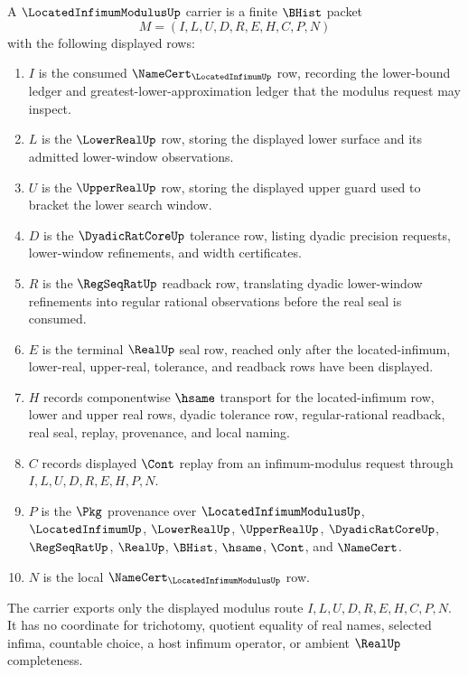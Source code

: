 \begin{definition}
\label{def:located-infimum-modulus-carrier}
A $\LocatedInfimumModulusUp$ carrier is a finite $\BHist$ packet
$$
M=(I,L,U,D,R,E,H,C,P,N)
$$
with the following displayed rows:
\begin{enumerate}
\item $I$ is the consumed $\NameCert_{\LocatedInfimumUp}$ row, recording the lower-bound ledger and greatest-lower-approximation ledger that the modulus request may inspect.
\item $L$ is the $\LowerRealUp$ row, storing the displayed lower surface and its admitted lower-window observations.
\item $U$ is the $\UpperRealUp$ row, storing the displayed upper guard used to bracket the lower search window.
\item $D$ is the $\DyadicRatCoreUp$ tolerance row, listing dyadic precision requests, lower-window refinements, and width certificates.
\item $R$ is the $\RegSeqRatUp$ readback row, translating dyadic lower-window refinements into regular rational observations before the real seal is consumed.
\item $E$ is the terminal $\RealUp$ seal row, reached only after the located-infimum, lower-real, upper-real, tolerance, and readback rows have been displayed.
\item $H$ records componentwise $\hsame$ transport for the located-infimum row, lower and upper real rows, dyadic tolerance row, regular-rational readback, real seal, replay, provenance, and local naming.
\item $C$ records displayed $\Cont$ replay from an infimum-modulus request through $I,L,U,D,R,E,H,P,N$.
\item $P$ is the $\Pkg$ provenance over $\LocatedInfimumModulusUp$, $\LocatedInfimumUp$, $\LowerRealUp$, $\UpperRealUp$, $\DyadicRatCoreUp$, $\RegSeqRatUp$, $\RealUp$, $\BHist$, $\hsame$, $\Cont$, and $\NameCert$.
\item $N$ is the local $\NameCert_{\LocatedInfimumModulusUp}$ row.
\end{enumerate}
The carrier exports only the displayed modulus route $I,L,U,D,R,E,H,C,P,N$. It has no coordinate for trichotomy, quotient equality of real names, selected infima, countable choice, a host infimum operator, or ambient $\RealUp$ completeness.
\end{definition}

